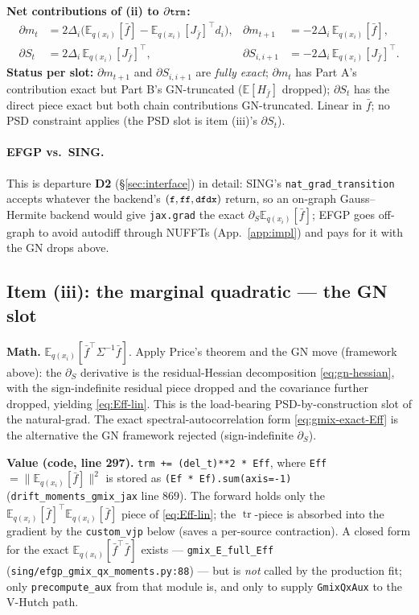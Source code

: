 \documentclass[11pt]{article}
\newcommand{\E}{\mathbb{E}}
\newcommand{\Eqx}{\mathbb{E}_{q(x_i)}}
\newcommand{\tr}{\operatorname{tr}}
\newcommand{\code}[1]{\texttt{\small #1}}
\begin{document}
\textbf{Net contributions of (ii) to $\partial \code{trm}$:}
\begin{align*}
\partial m_t        &= 2\Delta_i\bigl(\Eqx[\bar f] - \Eqx[J_{\bar f}]^\top d_i\bigr), &
\partial m_{t+1}    &= -2\Delta_i\,\Eqx[\bar f], \\
\partial S_t        &= 2\Delta_i\,\Eqx[J_{\bar f}]^\top, &
\partial S_{i,i+1}  &= -2\Delta_i\,\Eqx[J_{\bar f}]^\top.
\end{align*}
\textbf{Status per slot:} $\partial m_{t+1}$ and $\partial S_{i,i+1}$
are \emph{fully exact}; $\partial m_t$ has Part A's contribution exact
but Part B's GN-truncated ($\E[H_{\bar f}]$ dropped); $\partial S_t$
has the direct piece exact but both chain contributions GN-truncated.
Linear in $\bar f$; no PSD constraint applies (the PSD slot is item
(iii)'s $\partial S_t$).

\paragraph{EFGP vs.\ SING.}
This is departure \textbf{D2} (\S\ref{sec:interface}) in detail: SING's
\code{nat\_grad\_transition} accepts whatever the backend's
$(\code{f},\code{ff},\code{dfdx})$ return, so an on-graph
Gauss--Hermite backend would give \code{jax.grad} the exact
$\partial_S\Eqx[\bar f]$; EFGP goes off-graph to avoid autodiff through
NUFFTs (App.~\ref{app:impl}) and pays for it with the GN drops above.

\subsection*{Item (iii): the marginal quadratic --- the GN slot}
\label{sec:approximations}

\textbf{Math.} $\Eqx[\bar f^\top \Sigma^{-1}\bar f]$. Apply Price's
theorem and the GN move (framework above): the $\partial_S$ derivative
is the residual-Hessian decomposition \eqref{eq:gn-hessian}, with the
sign-indefinite residual piece dropped and the covariance further
dropped, yielding \eqref{eq:Eff-lin}. This is the load-bearing
PSD-by-construction slot of the natural-grad. The exact
spectral-autocorrelation form \eqref{eq:gmix-exact-Eff} is the
alternative the GN framework rejected (sign-indefinite $\partial_S$).

\textbf{Value (code, line 297).} \code{trm += (del\_t)**2 * Eff},
where \code{Eff} $= \|\Eqx[\bar f]\|^2$ is stored as
\code{(Ef * Ef).sum(axis=-1)} (\code{drift\_moments\_gmix\_jax}
line 869). The forward holds only the $\Eqx[\bar f]^\top\Eqx[\bar f]$
piece of \eqref{eq:Eff-lin}; the $\tr$-piece is absorbed into the
gradient by the \code{custom\_vjp} below (saves a per-source
contraction). A closed form for the exact $\Eqx[\bar f^\top \bar f]$
exists --- \code{gmix\_E\_full\_Eff}
(\code{sing/efgp\_gmix\_qx\_moments.py:88}) --- but is \emph{not} called
by the production fit; only \code{precompute\_aux} from that module is,
and only to supply \code{GmixQxAux} to the V-Hutch path.
\end{document}
